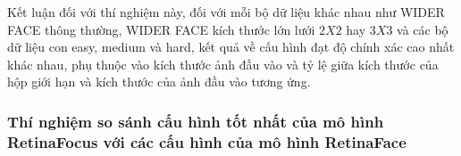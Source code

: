 {    \noindent
    Kết luận đối với thí nghiệm này, đối với mỗi bộ dữ liệu khác nhau như WIDER FACE thông thường, WIDER FACE kích thước lớn lưới $2 X 2$ hay $3 X 3$ và các bộ dữ liệu con easy, medium và hard, kết quả về cấu hình đạt độ chính xác cao nhất khác nhau, phụ thuộc vào kích thước ảnh đầu vào và tỷ lệ giữa kích thước của hộp giới hạn và kích thước của ảnh đầu vào tương ứng.

    \subsubsection*{Thí nghiệm so sánh cấu hình tốt nhất của mô hình RetinaFocus với các cấu hình của mô hình RetinaFace}
    
    \begin{figure}[H]
        \centering

\end{figure}}
